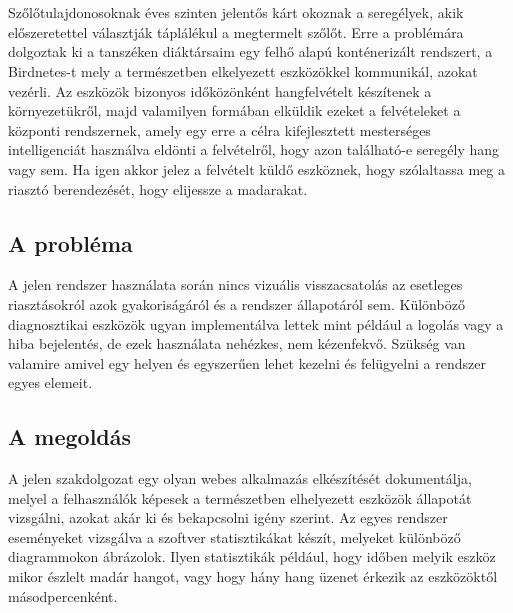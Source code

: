 \chapter{\bevezetes}
Szőlőtulajdonosoknak éves szinten jelentős kárt okoznak a seregélyek, akik előszeretettel választják táplálékul a megtermelt szőlőt.
Erre a problémára dolgoztak ki a tanszéken diáktársaim egy felhő alapú konténerizált rendszert, a Birdnetes-t
mely a természetben elkelyezett eszközökkel kommunikál, azokat vezérli.
Az eszközök bizonyos időközönként hangfelvételt készítenek a környezetükről,
majd valamilyen formában elküldik ezeket a felvételeket a központi rendszernek,
amely egy erre a célra kifejlesztett mesterséges intelligenciát használva eldönti
a felvételről, hogy azon található-e seregély hang vagy sem.
Ha igen akkor jelez a felvételt küldő eszköznek, hogy szólaltassa meg a riasztó
berendezését, hogy elijessze a madarakat.

\section{A probléma}
A jelen rendszer használata során nincs vizuális visszacsatolás az esetleges riasztásokról azok gyakoriságáról
és a rendszer állapotáról sem. Különböző diagnosztikai eszközök ugyan implementálva lettek mint például
a logolás vagy a hiba bejelentés, de ezek használata nehézkes, nem kézenfekvő. 
Szükség van valamire amivel egy helyen és egyszerűen lehet kezelni és felügyelni a rendszer egyes elemeit.

\section{A megoldás}
A jelen szakdolgozat egy olyan webes alkalmazás elkészítését dokumentálja, melyel a felhasználók képesek
a természetben elhelyezett eszközök állapotát vizsgálni, azokat akár ki és bekapcsolni igény szerint.
Az egyes rendszer eseményeket vizsgálva a szoftver statisztikákat készít, melyeket különböző diagrammokon ábrázolok.
Ilyen statisztikák például, hogy időben melyik eszköz mikor észlelt madár hangot, vagy hogy hány hang üzenet érkezik
az eszközöktől másodpercenként.

